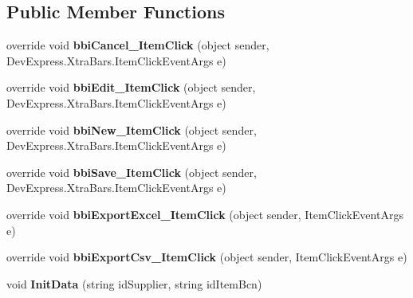 \subsection*{Public Member Functions}
\begin{DoxyCompactItemize}
\item 
\mbox{\label{class_h_k_supply_1_1_forms_1_1_master_1_1_supplier_price_list_management_af49f8bb1d8c6ab132c35cfbb79092fcb}} 
override void {\bfseries bbi\+Cancel\+\_\+\+Item\+Click} (object sender, Dev\+Express.\+Xtra\+Bars.\+Item\+Click\+Event\+Args e)
\item 
\mbox{\label{class_h_k_supply_1_1_forms_1_1_master_1_1_supplier_price_list_management_a3aaf16113c98ec5d7d7a8a0b5ae200d3}} 
override void {\bfseries bbi\+Edit\+\_\+\+Item\+Click} (object sender, Dev\+Express.\+Xtra\+Bars.\+Item\+Click\+Event\+Args e)
\item 
\mbox{\label{class_h_k_supply_1_1_forms_1_1_master_1_1_supplier_price_list_management_a0abd68df64bee5ee456a573441a189db}} 
override void {\bfseries bbi\+New\+\_\+\+Item\+Click} (object sender, Dev\+Express.\+Xtra\+Bars.\+Item\+Click\+Event\+Args e)
\item 
\mbox{\label{class_h_k_supply_1_1_forms_1_1_master_1_1_supplier_price_list_management_a65532d8b754e6dcb6af8095c065fc28e}} 
override void {\bfseries bbi\+Save\+\_\+\+Item\+Click} (object sender, Dev\+Express.\+Xtra\+Bars.\+Item\+Click\+Event\+Args e)
\item 
\mbox{\label{class_h_k_supply_1_1_forms_1_1_master_1_1_supplier_price_list_management_a3bd81a55c347f3d363fa84af4388c3c0}} 
override void {\bfseries bbi\+Export\+Excel\+\_\+\+Item\+Click} (object sender, Item\+Click\+Event\+Args e)
\item 
\mbox{\label{class_h_k_supply_1_1_forms_1_1_master_1_1_supplier_price_list_management_a292d0e1b64b0997cc5e1ef1dd224e30e}} 
override void {\bfseries bbi\+Export\+Csv\+\_\+\+Item\+Click} (object sender, Item\+Click\+Event\+Args e)
\item 
\mbox{\label{class_h_k_supply_1_1_forms_1_1_master_1_1_supplier_price_list_management_a903b4b6a74eeb7d2924281cb36017c60}} 
void {\bfseries Init\+Data} (string id\+Supplier, string id\+Item\+Bcn)
\end{DoxyCompactItemize}
